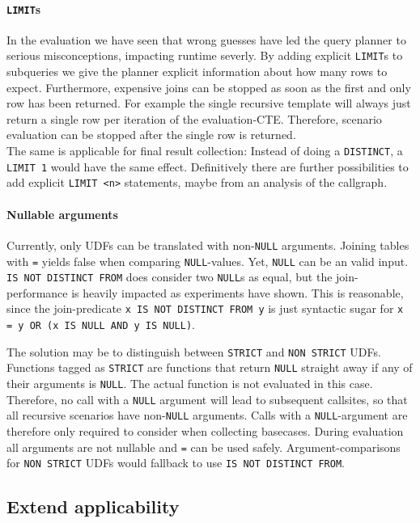 \paragraph*{\texttt{LIMIT}s}
In the evaluation we have seen that wrong guesses have led the query planner to serious misconceptions, impacting runtime severly. By adding explicit \texttt{LIMIT}s to subqueries we give the planner explicit information about how many rows to expect. Furthermore, expensive joins can be stopped as soon as the first and only row has been returned. For example the single recursive template will always just return a single row per iteration of the evaluation-CTE. Therefore, scenario evaluation can be stopped after the single row is returned.\\
The same is applicable for final result collection: Instead of doing a \texttt{DISTINCT}, a \texttt{LIMIT 1} would have the same effect. Definitively there are further possibilities to add explicit \texttt{LIMIT <n>} statements, maybe from an analysis of the callgraph.

\paragraph*{Nullable arguments}
Currently, only UDFs can be translated with non-\texttt{NULL} arguments. Joining tables with \texttt{=} yields false when comparing \texttt{NULL}-values. Yet, \texttt{NULL} can be an valid input. \texttt{IS NOT DISTINCT FROM} does consider two \texttt{NULL}s as equal, but the join-performance is heavily impacted as experiments have shown. This is reasonable, since the join-predicate \texttt{x IS NOT DISTINCT FROM y} is just syntactic sugar for \texttt{x = y OR (x IS NULL AND y IS NULL)}.

The solution may be to distinguish between \texttt{STRICT} and \texttt{NON STRICT} UDFs. Functions tagged as \texttt{STRICT} are functions that return \texttt{NULL} straight away if any of their arguments is \texttt{NULL}. The actual function is not evaluated in this case. Therefore, no call with a \texttt{NULL} argument will lead to subsequent callsites, so that all recursive scenarios have non-\texttt{NULL} arguments. Calls with a \texttt{NULL}-argument are therefore only required to consider when collecting basecases. During evaluation all arguments are not nullable and \texttt{=} can be used safely. Argument-comparisons for \texttt{NON STRICT} UDFs would fallback to use \texttt{IS NOT DISTINCT FROM}.

\subsection{Extend applicability}

